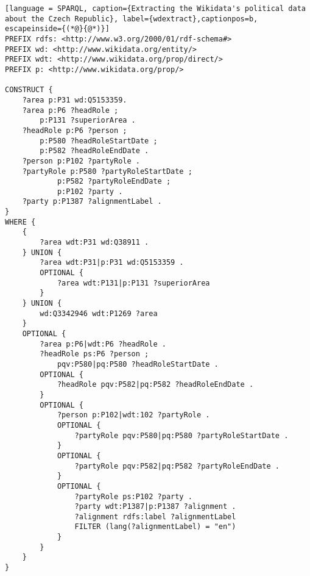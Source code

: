 \begin{lstlisting}[language = SPARQL, caption={Extracting the Wikidata's political data about the Czech Republic}, label={wdextract},captionpos=b, escapeinside={(*@}{@*)}]
PREFIX rdfs: <http://www.w3.org/2000/01/rdf-schema#>
PREFIX wd: <http://www.wikidata.org/entity/>
PREFIX wdt: <http://www.wikidata.org/prop/direct/>
PREFIX p: <http://www.wikidata.org/prop/>

CONSTRUCT {
    ?area p:P31 wd:Q5153359.
    ?area p:P6 ?headRole ; 
        p:P131 ?superiorArea .
    ?headRole p:P6 ?person ;
        p:P580 ?headRoleStartDate ;
        p:P582 ?headRoleEndDate .
    ?person p:P102 ?partyRole .
    ?partyRole p:P580 ?partyRoleStartDate ;
            p:P582 ?partyRoleEndDate ;
            p:P102 ?party .
    ?party p:P1387 ?alignmentLabel .
}
WHERE {
    {
        ?area wdt:P31 wd:Q38911 .
    } UNION {
        ?area wdt:P31|p:P31 wd:Q5153359 .
        OPTIONAL {
            ?area wdt:P131|p:P131 ?superiorArea
        }
    } UNION {
        wd:Q3342946 wdt:P1269 ?area
    }
    OPTIONAL {
        ?area p:P6|wdt:P6 ?headRole .
        ?headRole ps:P6 ?person ;
            pqv:P580|pq:P580 ?headRoleStartDate .
        OPTIONAL {
            ?headRole pqv:P582|pq:P582 ?headRoleEndDate .
        }
        OPTIONAL {
            ?person p:P102|wdt:102 ?partyRole .
            OPTIONAL {
                ?partyRole pqv:P580|pq:P580 ?partyRoleStartDate .
            }
            OPTIONAL {
                ?partyRole pqv:P582|pq:P582 ?partyRoleEndDate .
            }
            OPTIONAL {
                ?partyRole ps:P102 ?party .
                ?party wdt:P1387|p:P1387 ?alignment .
                ?alignment rdfs:label ?alignmentLabel
                FILTER (lang(?alignmentLabel) = "en")
            }
        }
    }
}
\end{lstlisting}


